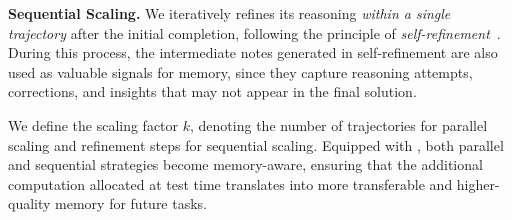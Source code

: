 \noindent\textbf{Sequential Scaling.} 
We iteratively refines its reasoning \textit{within a single trajectory} after the initial completion, following the principle of \textit{self-refinement}~\citep{madaan2023self}. 
During this process, the intermediate notes generated in self-refinement are also used as valuable signals for memory, since they capture reasoning attempts, corrections, and insights that may not appear in the final solution. 

We define the scaling factor $k$, denoting the number of trajectories for parallel scaling and refinement steps for sequential scaling. Equipped with \ours{}, both parallel and sequential strategies become memory-aware, ensuring that the additional computation allocated at test time translates into more transferable and higher-quality memory for future tasks.
